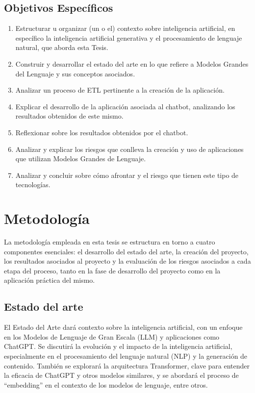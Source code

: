 \subsection{Objetivos Específicos}

\begin{enumerate}
    \item Estructurar u organizar (un o el) contexto sobre inteligencia artificial, en específico la inteligencia artificial generativa y el procesamiento de lenguaje natural, que aborda esta Tesis. 
    \item Construir y desarrollar el estado del arte en lo que refiere a Modelos Grandes del Lenguaje y sus conceptos asociados.
    \item Analizar un proceso de ETL pertinente a la creación de la aplicación.
    \item Explicar el desarrollo de la aplicación asociada al chatbot, analizando los resultados obtenidos de este mismo.
    \item Reflexionar sobre los resultados obtenidos por el chatbot.
    \item Analizar y explicar los riesgos que conlleva la creación y uso de aplicaciones que utilizan Modelos Grandes de Lenguaje. 
    \item Analizar y concluir sobre cómo afrontar y el riesgo que tienen este tipo de tecnologías.
\end{enumerate}


\section{Metodología}

La metodología empleada en esta tesis se estructura en torno a cuatro componentes esenciales: 
el desarrollo del estado del arte, la creación del proyecto, los resultados asociados al proyecto y la evaluación de los riesgos asociados 
a cada etapa del proceso, tanto en la fase de desarrollo del proyecto como en la aplicación práctica del mismo.

\subsection{Estado del arte}
El Estado del Arte dará contexto sobre la inteligencia artificial, con un enfoque en los Modelos de Lenguaje de Gran Escala (LLM) 
y aplicaciones como ChatGPT. Se discutirá la evolución y el impacto de la inteligencia artificial, especialmente en el procesamiento 
del lenguaje natural (NLP) y la generación de contenido. También se explorará la arquitectura Transformer, clave para entender la 
eficacia de ChatGPT y otros modelos similares, y se abordará el proceso de ``embedding'' en el contexto de los modelos de lenguaje, entre otros.


